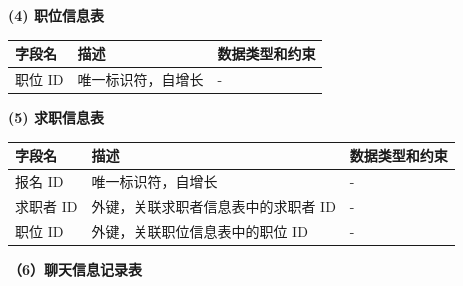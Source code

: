 \documentclass[UTF8,a4paper,10pt]{ctexart}
\begin{document}
\textbf{(4) 职位信息表}\\
\begin{center}
\begin{tabular}{|l|l|l|}
\hline
字段名 & 描述 & 数据类型和约束 \\
\hline
职位 ID & 唯一标识符，自增长 & - \\
\hline
\end{tabular}
\end{center}

\textbf{(5) 求职信息表}\\
\begin{center}
\begin{tabular}{|l|l|l|}
\hline
字段名 & 描述 & 数据类型和约束 \\
\hline
报名 ID & 唯一标识符，自增长 & - \\
求职者 ID & 外键，关联求职者信息表中的求职者 ID & - \\
职位 ID & 外键，关联职位信息表中的职位 ID & - \\
\hline
\end{tabular}
\end{center}

\textbf{（6）聊天信息记录表}\\
\end{document}
